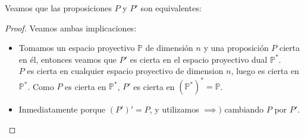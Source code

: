 
Veamos que las proposiciones $P$ y $P'$ son equivalentes:

\begin{proof}
    Veamos ambas implicaciones:
    \begin{itemize}
        \item[$\implies )$] Tomamos un espacio proyectivo $\mathbb{P}$ de dimensión $n$ y una proposición $P$ cierta en él, entonces veamos que $P'$ es cierta en el espacio proyectivo dual $\mathbb{P}^*$.\\
        $P$ es cierta en cualquier espacio proyectivo de dimension $n$, luego es cierta en $\mathbb{P}^*$. Como $P$ es cierta en $\mathbb{P}^*$, $P'$ es cierta en $(\mathbb{P}^*)^* = \mathbb{P}$.
        \item[$\impliedby )$] Inmediatamente porque $(P')' = P$, y utilizamos $\implies )$ cambiando $P$ por $P'$.
    \end{itemize}
\end{proof}

